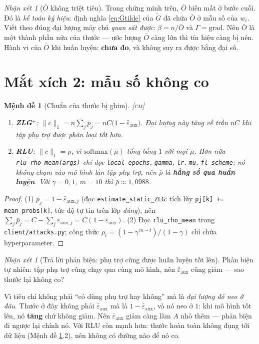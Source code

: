 \documentclass[11pt,a4paper]{article}
\newtheorem{menhde}[dinhly]{Mệnh đề}
\theoremstyle{remark}
\newtheorem{nhanxet}[dinhly]{Nhận xét}
\newcommand{\epsaux}{\bar\varepsilon_{\mathrm{aux}}}
\newcommand{\code}[1]{\texttt{\small #1}}
\begin{document}
\begin{nhanxet}[$\bar O$ không triệt tiêu]
\label{nx:Obar}
Trong chứng minh trên, $\bar O$ biến mất ở bước cuối. Đó là \emph{kế toán ký
hiệu}: định nghĩa \eqref{eq:Gtilde} của $\tilde G$ đã chứa $\bar O$ ở mẫu số
của $w_i$. Viết theo đúng đại lượng máy chủ \emph{quan sát được}:
$\beta=n/\bar O$ và $\Gamma=\mathrm{grad}$. Nên $\bar O$ là một thành phần
nữa của thước --- ước lượng $\bar O$ càng lớn thì tín hiệu càng bị nén. Hành
vi của $\bar O$ khi huấn luyện: \textbf{chưa đo}, và không suy ra được bằng
đại số.
\end{nhanxet}

\section{Mắt xích 2: mẫu số không co}
\label{sec:mau-so}

\begin{menhde}[Chuẩn của thước bị ghim]
\label{md:ghim}
\textsc{[cm]}\;
\begin{enumerate}
\item \textbf{ZLG$^+$}: $\|c\|_1=n\sum_j\bar p_j=nC\bigl(1-\epsaux\bigr)$.
  Đại lượng này \emph{tăng} về trần $nC$ khi tập phụ trợ được phân loại tốt
  hơn.
\item \textbf{RLU}: $\|c\|_1=\bar\rho$, vì $\mathrm{softmax}(\bar\mu)$ tổng
  bằng $1$ với mọi $\bar\mu$. Hơn nữa \code{rlu\_rho\_mean(args)} chỉ đọc
  \code{local\_epochs}, \code{gamma}, \code{lr}, \code{mu},
  \code{fl\_scheme}; nó \emph{không} chạm vào mô hình lẫn tập phụ trợ, nên
  $\bar\rho$ là \textbf{hằng số qua huấn luyện}. Với $\gamma=0{,}1$, $m=10$
  thì $\bar\rho\approx1{,}0988$.
\end{enumerate}
\end{menhde}

\begin{proof}
(1) $\bar p_j=1-\bar\varepsilon_{\mathrm{aux},j}$ (đọc
\code{estimate\_static\_ZLG}: tích lũy \code{pj[k] += mean\_probs[k]}, tức độ
tự tin trên lớp \emph{đúng}), nên
$\sum_j\bar p_j=C-\sum_j\bar\varepsilon_{\mathrm{aux},j}=C(1-\epsaux)$.
(2) Đọc \code{rlu\_rho\_mean} trong \code{client/attacks.py}; công thức
$\rho_t=(1-\gamma^{\,m-t})/(1-\gamma)$ chỉ chứa hyperparameter.
\end{proof}

\begin{nhanxet}[Trả lời phản biện: phụ trợ cũng được huấn luyện tốt lên]
\label{nx:phanbien}
Phản biện tự nhiên: tập phụ trợ cũng chạy qua cùng mô hình, nên $\epsaux$
cũng giảm --- sao thước lại không co?

Vì tiêu chí không phải ``có dùng phụ trợ hay không'' mà là \emph{đại lượng đó
neo ở đâu}. Thước ở đây không phải $\epsaux$ mà là $1-\epsaux$, và nó neo ở
$1$: khi mô hình tốt lên, nó \textbf{tăng} chứ không giảm. Nên $\epsaux$ giảm
càng làm $A$ nhỏ thêm --- phản biện đi ngược lại chính nó. Với RLU còn mạnh
hơn: thước hoàn toàn không đụng tới dữ liệu (Mệnh đề \ref{md:ghim}.2), nên
không có đường nào để nó co.
\end{nhanxet}
\end{document}
